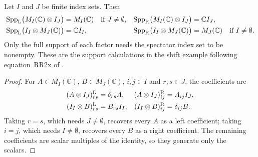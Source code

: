 \begin{lemma}
    \label{lem:qca_kronecker_embedding_supports}
    \leanok
    Let $I$ and $J$ be finite index sets. Then
    \begin{align}
        \operatorname{Spp}_{\mathrm L}
        \bigl(M_I(\mathbb C)\otimes I_J\bigr)
                                       & =M_I(\mathbb C)
        \quad\text{if }J\neq\emptyset, &
        \operatorname{Spp}_{\mathrm R}
        \bigl(M_I(\mathbb C)\otimes I_J\bigr)
                                       & =\mathbb C I_J,\notag   \\
        \operatorname{Spp}_{\mathrm L}
        \bigl(I_I\otimes M_J(\mathbb C)\bigr)
                                       & =\mathbb C I_I,       &
        \operatorname{Spp}_{\mathrm R}
        \bigl(I_I\otimes M_J(\mathbb C)\bigr)
                                       & =M_J(\mathbb C)
        \quad\text{if }I\neq\emptyset.
        \label{eq:qca_kronecker_embedding_supports}
    \end{align}
    Only the full support of each factor needs the spectator index set to
    be nonempty. These are the support calculations in the shift example
    following equation~RR2x of
    \cite[lines~1251--1268]{Gross2012IndexTheory}.
\end{lemma}
\begin{proof}\leanok
    For $A\in M_I(\mathbb C)$, $B\in M_J(\mathbb C)$, $i,j\in I$ and
    $r,s\in J$, the coefficients are
    \begin{align}
        (A\otimes I_J)^{\mathrm L}_{rs}
         & =\delta_{rs}A,    &
        (A\otimes I_J)^{\mathrm R}_{ij}
         & =A_{ij}I_J,\notag   \\
        (I_I\otimes B)^{\mathrm L}_{rs}
         & =B_{rs}I_I,       &
        (I_I\otimes B)^{\mathrm R}_{ij}
         & =\delta_{ij}B.
        \label{eq:qca_kronecker_embedding_coefficients}
    \end{align}
    Taking $r=s$, which needs $J\neq\emptyset$, recovers every $A$ as a
    left coefficient; taking $i=j$, which needs $I\neq\emptyset$, recovers
    every $B$ as a right coefficient. The remaining coefficients are scalar
    multiples of the identity, so they generate only the scalars.
\end{proof}

